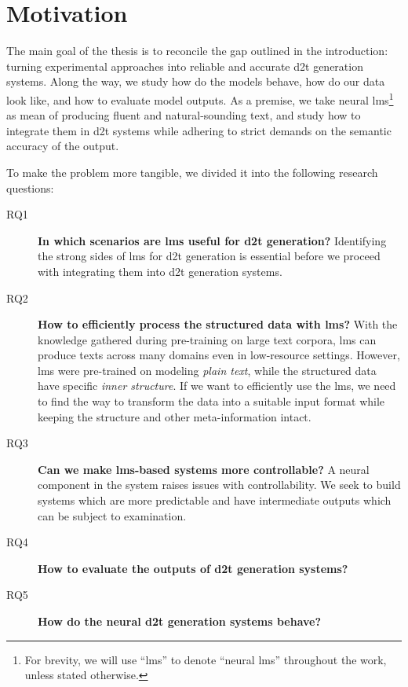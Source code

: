 





\section{Motivation}
\label{sec:rq}

The main goal of the thesis is to reconcile the gap outlined in the introduction: turning experimental approaches into reliable and accurate \ac{d2t} generation systems. Along the way, we study how do the models behave, how do our data look like, and how to evaluate model outputs. As a premise, we take neural \acp{lm}\footnote{For brevity, we will use ``\acp{lm}'' to denote ``neural \acp{lm}'' throughout the work, unless stated otherwise.} as mean of producing fluent and natural-sounding text, and study how to integrate them in \ac{d2t} systems while adhering to strict demands on the semantic accuracy of the output.

To make the problem more tangible, we divided it into the following research questions:

\begin{description}
    \item[RQ1] \textbf{In which scenarios are \acp{lm} useful for \ac{d2t} generation?} Identifying the strong sides of \acp{lm} for \ac{d2t} generation is essential before we proceed with integrating them into \ac{d2t} generation systems.
    \item[RQ2] \textbf{How to efficiently process the structured data with \acp{lm}?} With the knowledge gathered during pre-training on large text corpora, \acp{lm} can produce texts across many domains even in low-resource settings. However, \acp{lm} were pre-trained on modeling \emph{plain text}, while the structured data have specific \emph{inner structure}. If we want to efficiently use the \acp{lm}, we need to find the way to transform the data into a suitable input format while keeping the structure and other meta-information intact.
    \item[RQ3] \textbf{Can we make \acp{lm}-based systems more controllable?} A neural component in the system raises issues with controllability. We seek to build systems which are more predictable and have intermediate outputs which can be subject to examination.
    \item[RQ4] \textbf{How to evaluate the outputs of \ac{d2t} generation systems?}
    \item[RQ5] \textbf{How do the neural \ac{d2t} generation systems behave?}
\end{description}



